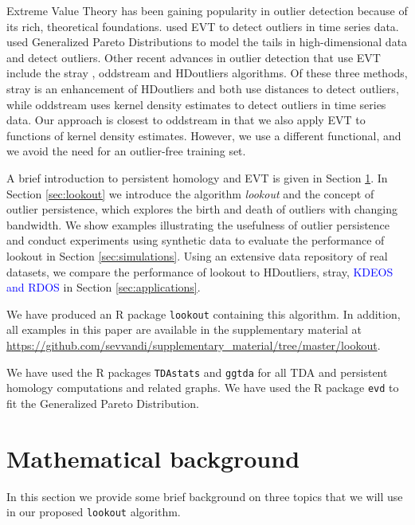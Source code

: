 \documentclass[12pt]{article}
\theoremstyle{definition}
\theoremstyle{definition}
\theoremstyle{definition}
\theoremstyle{definition}
\theoremstyle{remark}
\begin{document}
Extreme Value Theory has been gaining popularity in outlier detection because of its rich, theoretical foundations. \citet{Burridge2006} used EVT to detect outliers in time series data. \citet{Clifton2014} used Generalized Pareto Distributions to model the tails in high-dimensional data and detect outliers. Other recent advances in outlier detection that use EVT include the stray \citep{stray}, oddstream \citep{talagala2019anomaly} and HDoutliers \citep{wilkinson2017visualizing} algorithms. Of these three methods, stray is an enhancement of HDoutliers and both use distances to detect outliers, while oddstream uses kernel density estimates to detect outliers in time series data. Our approach is closest to oddstream in that we also apply EVT to functions of kernel density estimates. However, we use a different functional, and we avoid the need for an outlier-free training set.

A brief introduction to persistent homology and EVT is given in Section \ref{sec:methodology}. In Section \ref{sec:lookout} we introduce the algorithm \emph{lookout} and the concept of outlier persistence, which explores the birth and death of outliers with changing bandwidth. We show examples illustrating the usefulness of outlier persistence and conduct experiments using synthetic data to evaluate the performance of lookout in Section \ref{sec:simulations}. Using an extensive data repository of real datasets, we compare the performance of lookout to HDoutliers, stray, \textcolor{blue}{KDEOS} \citep{Schubert2014} \textcolor{blue}{and RDOS} \citep{Tang2017} in Section \ref{sec:applications}.

We have produced an R package \texttt{lookout} \citep{lookoutR} containing this algorithm. In addition, all examples in this paper are available in the supplementary material at \url{https://github.com/sevvandi/supplementary_material/tree/master/lookout}.

We have used the R packages \texttt{TDAstats} \citep{tdastatsR} and \texttt{ggtda} \citep{ggtda} for all TDA and persistent homology computations and related graphs. We have used the R package \texttt{evd} \citep{evdR} to fit the Generalized Pareto Distribution.

\hypertarget{sec:methodology}{%
\section{Mathematical background}\label{sec:methodology}}

In this section we provide some brief background on three topics that we will use in our proposed \texttt{lookout} algorithm.
\end{document}
